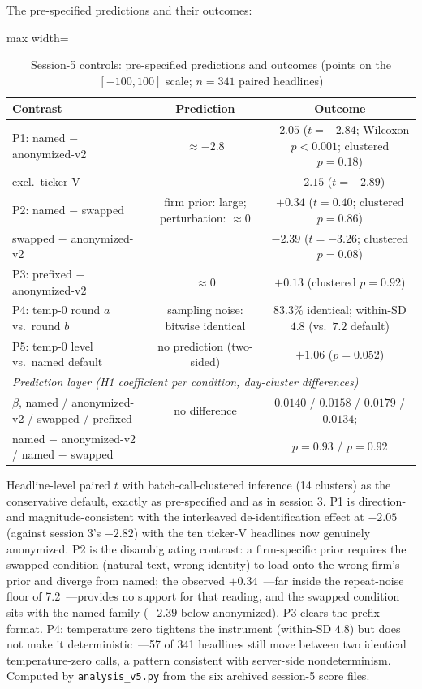 The pre-specified predictions and their outcomes:

\begin{table}[htbp]
\centering
\small
\caption{Session-5 controls: pre-specified predictions and outcomes (points on the $[-100,100]$ scale; $n=341$ paired headlines)}
\label{tab:s5}
\begin{adjustbox}{max width=\textwidth}
\begin{tabular}{lcc}
\toprule
Contrast & Prediction & Outcome \\
\midrule
P1: named $-$ anonymized-v2 & $\approx -2.8$ & $-2.05$ ($t=-2.84$; Wilcoxon $p<0.001$; clustered $p=0.18$) \\
\quad excl.\ ticker V & & $-2.15$ ($t=-2.89$) \\
P2: named $-$ swapped & firm prior: large; perturbation: $\approx 0$ & $+0.34$ ($t=0.40$; clustered $p=0.86$) \\
\quad swapped $-$ anonymized-v2 & & $-2.39$ ($t=-3.26$; clustered $p=0.08$) \\
P3: prefixed $-$ anonymized-v2 & $\approx 0$ & $+0.13$ (clustered $p=0.92$) \\
P4: temp-0 round $a$ vs.\ round $b$ & sampling noise: bitwise identical & $83.3\%$ identical; within-SD $4.8$ (vs.\ $7.2$ default) \\
P5: temp-0 level vs.\ named default & no prediction (two-sided) & $+1.06$ ($p=0.052$) \\
\midrule
\multicolumn{3}{l}{\emph{Prediction layer (H1 coefficient per condition, day-cluster differences)}} \\
$\beta$, named / anonymized-v2 / swapped / prefixed & no difference & $0.0140$ / $0.0158$ / $0.0179$ / $0.0134$; \\
named $-$ anonymized-v2 / named $-$ swapped & & $p=0.93$ / $p=0.92$ \\
\bottomrule
\end{tabular}
\end{adjustbox}
\begin{tablenotes}[flushleft]\footnotesize
\item Headline-level paired $t$ with batch-call-clustered inference (14 clusters) as the conservative default, exactly as pre-specified and as in session 3. P1 is direction- and magnitude-consistent with the interleaved de-identification effect at $-2.05$ (against session 3's $-2.82$) with the ten ticker-V headlines now genuinely anonymized. P2 is the disambiguating contrast: a firm-specific prior requires the swapped condition (natural text, wrong identity) to load onto the wrong firm's prior and diverge from named; the observed $+0.34$~---far inside the repeat-noise floor of 7.2~---provides no support for that reading, and the swapped condition sits with the named family ($-2.39$ below anonymized). P3 clears the prefix format. P4: temperature zero tightens the instrument (within-SD $4.8$) but does not make it deterministic~---57 of 341 headlines still move between two identical temperature-zero calls, a pattern consistent with server-side nondeterminism. Computed by \texttt{analysis\_v5.py} from the six archived session-5 score files.
\end{tablenotes}
\end{table}

